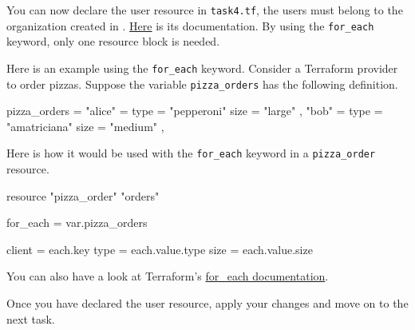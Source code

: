 You can now declare the user resource in \texttt{task4.tf}, the users must belong to the organization created in .
\href{https://intuinewin.github.io/taikun-docs/resources/user.html}{Here} is its documentation.
By using the \texttt{for\_each} keyword, only one resource block is needed.

\begin{tip}
  Here is an example using the \texttt{for\_each} keyword.
  Consider a Terraform provider to order pizzas.
  Suppose the variable \texttt{pizza\_orders} has the following definition.
  \begin{tf}
pizza_orders = {
  "alice" = {
    type = "pepperoni"
    size = "large"
  },
  "bob" = {
    type = "amatriciana"
    size = "medium"
  },
}
  \end{tf}
  Here is how it would be used with the \texttt{for\_each} keyword in a \texttt{pizza\_order} resource.
  \begin{tf}
resource "pizza_order" "orders" {
  for_each = var.pizza_orders

  client = each.key
  type   = each.value.type
  size   = each.value.size
}
  \end{tf}

  You can also have a look at Terraform's \href{https://www.terraform.io/docs/language/meta-arguments/for_each.html}{for\_each documentation}.
\end{tip}

Once you have declared the user resource, apply your changes and move on to the next task.
